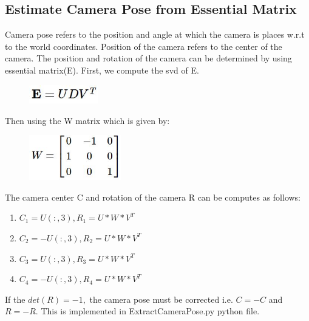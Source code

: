 \documentclass[12pt]{article}
\begin{document}
\subsection{Estimate Camera Pose from Essential Matrix}
Camera pose refers to the position and angle at which the camera is places w.r.t to the world coordinates. Position of the camera refers to the center of the camera. The position and rotation of the camera can be determined by using essential matrix(E). First, we compute the svd of E.
\begin{figure}[h]
    \centering
    \includegraphics[width=3cm]{EM3}
\end{figure}
\newline
Then using the W matrix which is given by:
\begin{figure}[h]
    \centering
    \includegraphics[width=4cm]{EM4}
\end{figure}
\newline
The camera center C and rotation of the camera R can be computes as follows:
\begin{enumerate}
\item $C_1 = U(:,3) , R_1 = U*W*V^{T}$
\item $C_2 = -U(:,3) , R_2 = U*W*V^{T}$
\item $C_3 = U(:,3) , R_3 = U*W*V^{T}$
\item $C_4 = -U(:,3) , R_4 = U*W*V^{T}$
\end{enumerate}
If the $det(R) = -1,$ the camera pose must be corrected i.e. $C=-C$ and $R=-R$. This is implemented in ExtractCameraPose.py python file.
\end{document}

